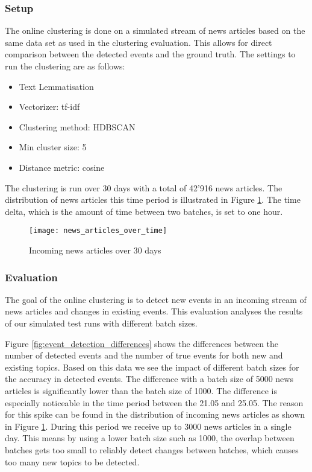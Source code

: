 \subsubsection{Setup}

The online clustering is done on a simulated stream of news articles based on the same data set as used in the clustering evaluation. This allows for direct comparison between the detected events and the ground truth. The settings to run the clustering are as follows:

\begin{itemize}
    \item Text Lemmatisation
    \item Vectorizer: tf-idf
    \item Clustering method: HDBSCAN
    \item Min cluster size: 5
    \item Distance metric: cosine
\end{itemize}

The clustering is run over 30 days with a total of 42'916 news articles. The distribution of news articles this time period is illustrated in Figure \ref{fig:news_articles_over_time}. The time delta, which is the amount of time between two batches, is set to one hour. 


\begin{figure}[h]
    \centering
    \texttt{[image: news\_articles\_over\_time]}
    \caption{Incoming news articles over 30 days}
    \label{fig:news_articles_over_time}
\end{figure}

\subsubsection{Evaluation}

The goal of the online clustering is to detect new events in an incoming stream of news articles and changes in existing events. This evaluation analyses the results of our simulated test runs with different batch sizes.

Figure \ref{fig:event_detection_differences} shows the differences between the number of detected events and the number of true events for both new and existing topics. Based on this data we see the impact of different batch sizes for the accuracy in detected events. The difference with a batch size of 5000 news articles is significantly lower than the batch size of 1000. The difference is especially noticeable in the time period between the 21.05 and 25.05. The reason for this spike can be found in the distribution of incoming news articles as shown in Figure \ref{fig:news_articles_over_time}. During this period we receive up to 3000 news articles in a single day. This means by using a lower batch size such as 1000, the overlap between batches gets too small to reliably detect changes between batches, which causes too many new topics to be detected. 

